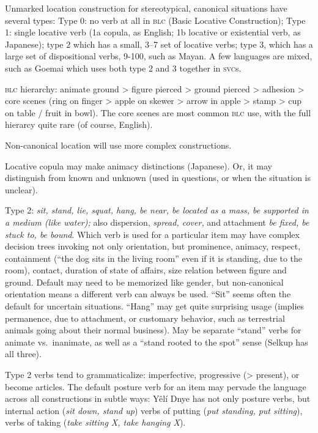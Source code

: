 \documentclass[11pt]{article}
\newcommand{\I}[1]{\textsc{#1}}   %
\begin{document}
{Unmarked location construction for stereotypical, canonical situations
have several types: Type 0: no verb at all in \I{blc} (Basic Locative
Construction); Type 1: single locative verb (1a copula, as English; 1b
locative or existential verb, as Japanese); type 2 which has a small,
3--7 set of locative verbs; type 3, which has a large set of
dispositional verbs, 9-100, such as Mayan.  A few languages are mixed,
such as Goemai which uses both type 2 and 3 together in \I{svc}s.

\I{blc} hierarchy: animate ground > figure pierced > ground pierced >
adhesion > core scenes (ring on finger > apple on skewer > arrow in
apple > stamp > cup on table / fruit in bowl).  The core scenes are
most common \I{blc} use, with the full hierarcy quite rare (of course,
English).

Non-canonical location will use more complex constructions.  

Locative copula may make animacy distinctions (Japanese).  Or, it may
distinguish from known and unknown (used in questions, or when the
situation is unclear).

Type 2: \textit{sit, stand, lie, squat, hang, be near, be located as a
mass, be supported in a medium (like water);} also dispersion,
\textit{spread, cover,} and attachment \textit{be fixed, be stuck to,
be bound}.  Which verb is used for a particular item may have
complex decision trees invoking not only orientation, but prominence,
animacy, respect, containment (``the dog sits in the living room''
even if it is standing, due to the room), contact, duration of state
of affairs, size relation between figure and ground.  Default may need
to be memorized like gender, but non-canonical orientation means a
different verb can always be used.  ``Sit'' seems often the default
for uncertain situations.  ``Hang'' may get quite surprising usage
(implies permanence, due to attachment, or customary behavior, such as
terrestrial animals going about their normal business).  May be
separate ``stand'' verbs for animate vs.\ inanimate, as well as a
``stand rooted to the spot'' sense (Selkup has all three).

Type 2 verbs tend to grammaticalize: imperfective, progressive (>
present), or become articles.  The default posture verb for an item
may pervade the language across all constructions in subtle ways: Yêlí
Dnye has not only posture verbs, but internal action (\textit{sit
down, stand up}) verbs of putting (\textit{put standing, put
sitting}), verbs of taking (\textit{take sitting X, take hanging
X}).

}
\end{document}
